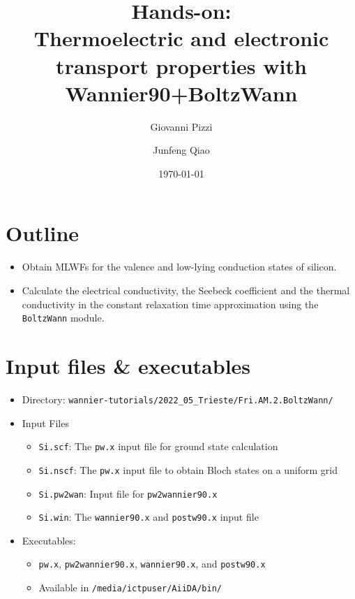 \documentclass[11pt,a4paper]{article}
\begin{document}

\title{Hands-on:\\
  \textbf{Thermoelectric and electronic transport properties with Wannier90+BoltzWann}}

\author{Giovanni Pizzi \and Junfeng Qiao}

\date{\today}
\maketitle

\newcommand{\wan}{\texttt{Wannier90}\xspace}
\newcommand{\boltzwan}{\texttt{BoltzWann}\xspace}
\newcommand{\pwx}{\texttt{pw.x}\xspace}
\newcommand{\ptowx}{\textnormal{\texttt{pw2wannier90.x}}\xspace}
\newcommand{\wanx}{\textnormal{\texttt{wannier90.x}}\xspace}
\newcommand{\postwanx}{\textnormal{\texttt{postw90.x}}\xspace}

\section{Outline}

\begin{itemize}
  \item Obtain MLWFs for the valence and low-lying conduction states of silicon.
  \item Calculate the electrical conductivity, the Seebeck coefficient and the thermal
        conductivity in the constant relaxation time approximation using the \boltzwan
        module\cite{Pizzi2014,Pizzi2014a}.
\end{itemize}

\section{Input files \& executables}
\begin{itemize}
  \item{Directory: \texttt{wannier-tutorials/2022\_05\_Trieste/Fri.AM.2.BoltzWann/}}
  \item{Input Files}
  \begin{itemize}
    \item \texttt{Si.scf}: The \pwx input file for ground state
          calculation
    \item \texttt{Si.nscf}: The \pwx input file to obtain Bloch
          states on a uniform grid
    \item \texttt{Si.pw2wan}: Input file for \ptowx
    \item \texttt{Si.win}: The \wanx and \postwanx input file
  \end{itemize}
  \item Executables:
        \begin{itemize}
          \item \pwx, \ptowx, \wanx, and \postwanx
          \item Available in \texttt{/media/ictpuser/AiiDA/bin/}
        \end{itemize}
\end{itemize}
\end{document}
